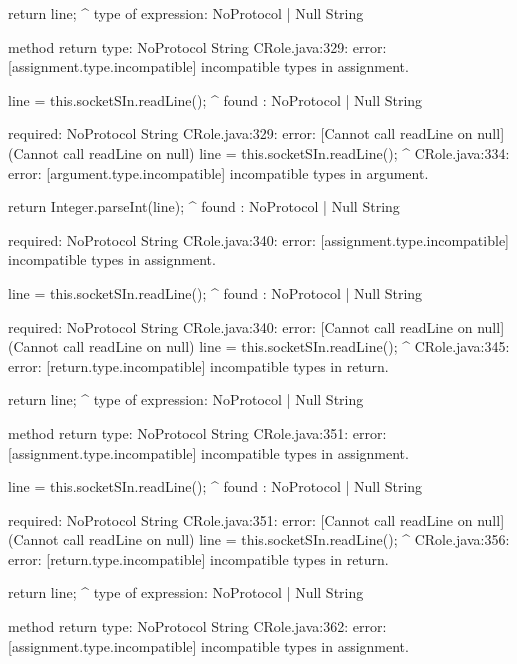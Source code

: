 \begin{code}
        return line;
               ^
  type of expression: NoProtocol | Null String

  method return type: NoProtocol String
CRole.java:329: error: [assignment.type.incompatible] incompatible types in assignment.

            line = this.socketSIn.readLine();
                                          ^
  found   : NoProtocol | Null String

  required: NoProtocol String
CRole.java:329: error: [Cannot call readLine on null] (Cannot call readLine on null)
            line = this.socketSIn.readLine();
                                          ^
CRole.java:334: error: [argument.type.incompatible] incompatible types in argument.

        return Integer.parseInt(line);
                                ^
  found   : NoProtocol | Null String

  required: NoProtocol String
CRole.java:340: error: [assignment.type.incompatible] incompatible types in assignment.

            line = this.socketSIn.readLine();
                                          ^
  found   : NoProtocol | Null String

  required: NoProtocol String
CRole.java:340: error: [Cannot call readLine on null] (Cannot call readLine on null)
            line = this.socketSIn.readLine();
                                          ^
CRole.java:345: error: [return.type.incompatible] incompatible types in return.

        return line;
               ^
  type of expression: NoProtocol | Null String

  method return type: NoProtocol String
CRole.java:351: error: [assignment.type.incompatible] incompatible types in assignment.

            line = this.socketSIn.readLine();
                                          ^
  found   : NoProtocol | Null String

  required: NoProtocol String
CRole.java:351: error: [Cannot call readLine on null] (Cannot call readLine on null)
            line = this.socketSIn.readLine();
                                          ^
CRole.java:356: error: [return.type.incompatible] incompatible types in return.

        return line;
               ^
  type of expression: NoProtocol | Null String

  method return type: NoProtocol String
CRole.java:362: error: [assignment.type.incompatible] incompatible types in assignment.


\end{code}
